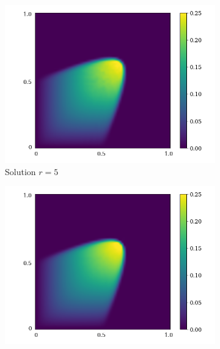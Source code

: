 \begin{figure}[!htb]
     \begin{center}
        \begin{subfigure}[b]{0.23\textwidth}
            \begin{center}
                \includegraphics[trim = {0, 0, 3cm, 0}, clip, width=\textwidth]{Pictures/X-rom-LE-CNNAE-5.png}
            \end{center}
             \caption{Solution $r = 5$}
         \end{subfigure}
    \begin{subfigure}[b]{0.23\textwidth}
            \begin{center}
                \includegraphics[trim = {0, 0, 3cm, 0}, clip, width=\textwidth]{Pictures/X-rom-LE-CNNAE-10.png}

\end{center}
\end{subfigure}
\end{center}
\end{figure}

